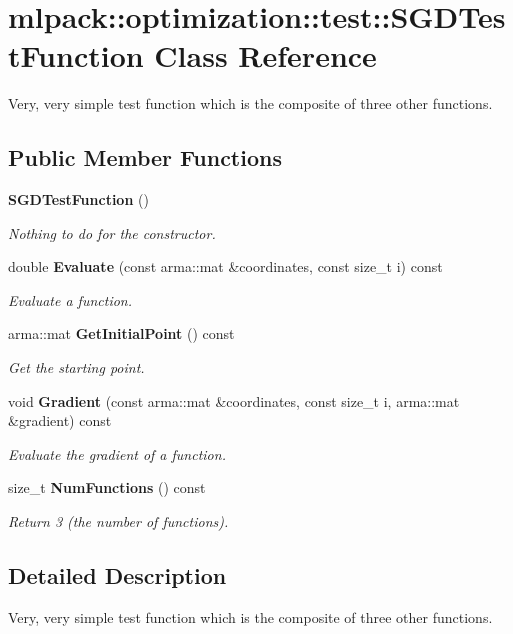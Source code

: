 \section{mlpack\-:\-:optimization\-:\-:test\-:\-:S\-G\-D\-Test\-Function Class Reference}
\label{classmlpack_1_1optimization_1_1test_1_1SGDTestFunction}


Very, very simple test function which is the composite of three other functions.  


\subsection*{Public Member Functions}
\begin{DoxyCompactItemize}
\item 
{\bf S\-G\-D\-Test\-Function} ()
\begin{DoxyCompactList}\small\item\em Nothing to do for the constructor. \end{DoxyCompactList}\item 
double {\bf Evaluate} (const arma\-::mat \&coordinates, const size\-\_\-t i) const 
\begin{DoxyCompactList}\small\item\em Evaluate a function. \end{DoxyCompactList}\item 
arma\-::mat {\bf Get\-Initial\-Point} () const 
\begin{DoxyCompactList}\small\item\em Get the starting point. \end{DoxyCompactList}\item 
void {\bf Gradient} (const arma\-::mat \&coordinates, const size\-\_\-t i, arma\-::mat \&gradient) const 
\begin{DoxyCompactList}\small\item\em Evaluate the gradient of a function. \end{DoxyCompactList}\item 
size\-\_\-t {\bf Num\-Functions} () const 
\begin{DoxyCompactList}\small\item\em Return 3 (the number of functions). \end{DoxyCompactList}\end{DoxyCompactItemize}


\subsection{Detailed Description}
Very, very simple test function which is the composite of three other functions. 

